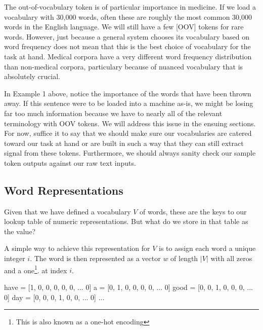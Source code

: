 The out-of-vocabulary token is of particular importance in medicine. If we load a vocabulary with 30,000 words, often these are roughly the most common 30,000 words in the English language. We will still have a few [OOV] tokens
for rare words. However, just because a general system chooses its vocabulary based on word frequency does not mean that this is the best choice of vocabulary for the task at hand. Medical corpora have a very different word frequency
distribution than non-medical corpora, particulary because of nuanced vocabulary that is absolutely crucial.

In Example 1 above, notice the importance of the words that have been thrown away. If this sentence were to be loaded into a machine as-is, we might be losing far too much information because we have to nearly all of the relevant terminology with OOV tokens.
We will address this issue in the ensuing sections. For now, suffice it to say that we should make sure our vocabularies are catered toward our task at hand or are built in such a way that they can still extract signal from these tokens. Furthermore, we should always sanity check our sample token outputs against our raw text inputs.

\subsection{Word Representations}

Given that we have defined a vocabulary $V$ of words, these are the keys to our lookup table of numeric representations. But what do we store in that table as the value?

A simple way to achieve this representation for $V$ is to assign each word a unique integer $i$.
The word is then represented as a vector $w$ of length $|V|$ with all zeros and a one\footnote{This is also known as a one-hot encoding}. at index $i$.

\begin{python}
  have = [1, 0, 0, 0, 0, 0, ... 0]
  a    = [0, 1, 0, 0, 0, 0, ... 0]
  good = [0, 0, 1, 0, 0, 0, ... 0]
  day  = [0, 0, 0, 1, 0, 0, ... 0]
  ...
\end{python}

